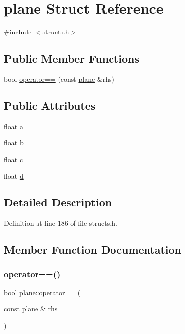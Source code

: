 \hypertarget{structplane}{}\section{plane Struct Reference}
\label{structplane}


{\ttfamily \#include $<$structs.\+h$>$}

\subsection*{Public Member Functions}
\begin{DoxyCompactItemize}
\item 
bool \mbox{\hyperlink{structplane_a7362172307c64ca0ba40633337f318ca}{operator==}} (const \mbox{\hyperlink{structplane}{plane}} \&rhs)
\end{DoxyCompactItemize}
\subsection*{Public Attributes}
\begin{DoxyCompactItemize}
\item 
float \mbox{\hyperlink{structplane_a93c319b577955eca012b2866db926c1f}{a}}
\item 
float \mbox{\hyperlink{structplane_af4a97d4328067448317dd787e048bc70}{b}}
\item 
float \mbox{\hyperlink{structplane_a3024e149a5b2cb4697fa71ae7d539bd1}{c}}
\item 
float \mbox{\hyperlink{structplane_a9a3cb65698785bad8199e7afbd083e27}{d}}
\end{DoxyCompactItemize}


\subsection{Detailed Description}


Definition at line 186 of file structs.\+h.



\subsection{Member Function Documentation}
\mbox{\label{structplane_a7362172307c64ca0ba40633337f318ca}} 
\subsubsection{\texorpdfstring{operator==()}{operator==()}}
{\footnotesize\ttfamily bool plane\+::operator== (\begin{DoxyParamCaption}\item[{const \mbox{\hyperlink{structplane}{plane}} \&}]{rhs }\end{DoxyParamCaption})\hspace{0.3cm}{\ttfamily [inline]}}



